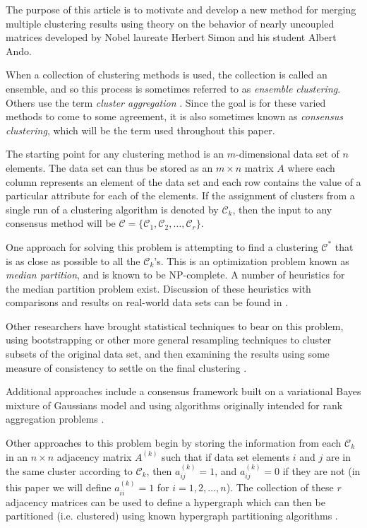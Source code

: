 \documentclass[final]{siamltex}
\begin{document}
The purpose of this article is to motivate and develop a new method for merging multiple clustering results using theory on the behavior of nearly uncoupled matrices developed by Nobel laureate Herbert Simon and his student Albert Ando.

When a collection of clustering methods is used, the collection is called an ensemble, and so this process is sometimes referred to as {\em ensemble clustering}. Others use the term {\em cluster aggregation} \cite{gionis2007ca}. Since the goal is for these varied methods to come to some agreement, it is also sometimes known as {\em consensus clustering}, which will be the term used throughout this paper.

The starting point for any clustering method is an $m$-dimensional data set of $n$ elements. The data set can thus be stored as an $m \times n$ matrix $A$ where each column represents an element of the data set and each row contains the value of a particular attribute for each of the elements. If the assignment of clusters from a single run of a clustering algorithm is denoted by $\mathcal{C}_{k}$, then the input to any consensus method will be $\mathcal{C} = \{\mathcal{C}_{1}, \mathcal{C}_{2}, \dots , \mathcal{C}_{r} \}$.

One approach for solving this problem is attempting to find a clustering $\mathcal{C}^{*}$ that is as close as possible to all the $\mathcal{C}_{k}$'s. This is an optimization problem known as \textit{median partition}, and is known to be NP-complete.  A number of heuristics for the median partition problem exist. Discussion of these heuristics with comparisons and results on real-world data sets can be found in \cite{filkov, filkovskiena, goderfilkov}.

Other researchers have brought statistical techniques to bear on this problem, using bootstrapping or other more general resampling techniques to cluster subsets of the original data set, and then examining the results using some measure of consistency to settle on the final clustering \cite{fredjain2003, consensusmit}. 

Additional approaches include a consensus framework built on a variational Bayes mixture of Gaussians model \cite{danish} and using algorithms originally intended for rank aggregation problems \cite{ailon2008aii}.

Other approaches to this problem begin by storing the information from each $\mathcal{C}_{k}$ in an $n \times n$ adjacency matrix $A^{(k)}$ such that if data set elements $i$ and $j$ are in the same cluster according to $\mathcal{C}_{k}$, then $a^{(k)}_{ij}=1$, and $a^{(k)}_{ij}=0$ if they are not (in this paper we will define $a^{(k)}_{ii}=1$ for $i=1,2, \dots, n$). The collection of these $r$ adjacency matrices can be used to define a hypergraph which can then be partitioned (i.e. clustered) using known hypergraph partitioning algorithms \cite{strehl}.
\end{document}
